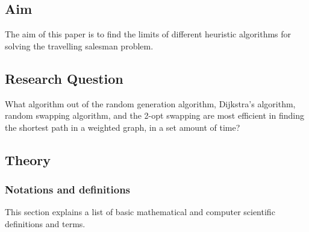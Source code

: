 \documentclass{article}
\begin{document}
\subsection{Aim}\label{Aim}
The aim of this paper is to find the limits of different heuristic algorithms for solving the travelling salesman problem. 

\subsection{Research Question}\label{RQ}
What algorithm out of the random generation algorithm, Dijkstra's algorithm, random swapping algorithm, and the 2-opt swapping are most efficient in finding the shortest path in a weighted graph, in a set amount of time?



\subsection{Theory}\label{Theory}

\subsubsection{Notations and definitions}\label{Notation and definitions}

This section explains a list of basic mathematical and computer scientific definitions and terms. 
\newline
\end{document}
